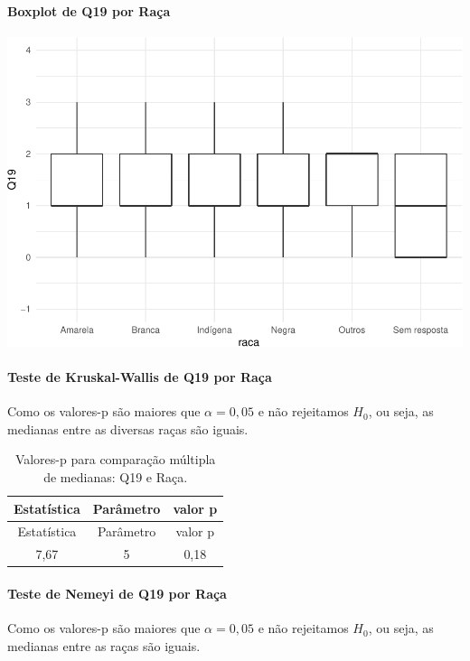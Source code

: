 \documentclass[]{article}
\let\oldparagraph\paragraph
\renewcommand{\paragraph}[1]{\oldparagraph{#1}\mbox{}}
\begin{document}
\hypertarget{boxplot-de-q19-por-rauxe7a}{%
\paragraph{Boxplot de Q19 por Raça}\label{boxplot-de-q19-por-rauxe7a}}

\begin{center}\includegraphics[width=0.75\linewidth]{relatorio_files/figure-latex/unnamed-chunk-275-1} \end{center}

\hypertarget{teste-de-kruskal-wallis-de-q19-por-rauxe7a}{%
\paragraph{Teste de Kruskal-Wallis de Q19 por Raça}\label{teste-de-kruskal-wallis-de-q19-por-rauxe7a}}

Como os valores-p são maiores que \(\alpha=0,05\) e não rejeitamos \(H_0\), ou seja, as medianas entre as diversas raças são iguais.

\begin{longtable}[]{@{}ccc@{}}
\caption{\label{tab:unnamed-chunk-276}Valores-p para comparação múltipla de medianas: Q19 e Raça.}\tabularnewline
\toprule
Estatística & Parâmetro & valor p\tabularnewline
\midrule
\endfirsthead
\toprule
Estatística & Parâmetro & valor p\tabularnewline
\midrule
\endhead
7,67 & 5 & 0,18\tabularnewline
\bottomrule
\end{longtable}

\hypertarget{teste-de-nemeyi-de-q19-por-rauxe7a}{%
\paragraph{Teste de Nemeyi de Q19 por Raça}\label{teste-de-nemeyi-de-q19-por-rauxe7a}}

Como os valores-p são maiores que \(\alpha=0,05\) e não rejeitamos \(H_0\), ou seja, as medianas entre as raças são iguais.
\end{document}

